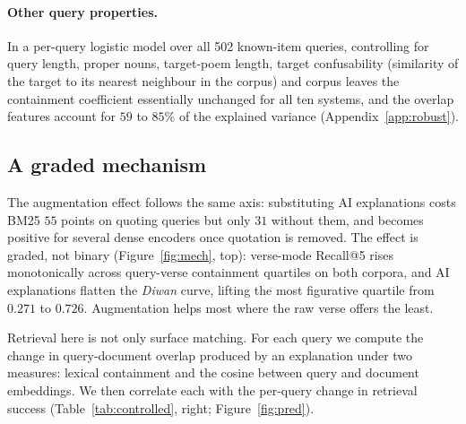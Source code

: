 \documentclass[11pt]{article}
\begin{document}
\paragraph{Other query properties.} In a per-query logistic model over all 502 known-item queries, controlling for query length, proper nouns, target-poem length, target confusability (similarity of the target to its nearest neighbour in the corpus) and corpus leaves the containment coefficient essentially unchanged for all ten systems, and the overlap features account for $59$ to $85\%$ of the explained variance (Appendix~\ref{app:robust}).

\begin{table}[t]
\centering\small
\setlength{\tabcolsep}{2.1pt}

\caption{Left: verse-mode Recall@5 on \textit{Fann or Flop}, stratified by verbatim quotation, with slope $\Delta$ and its difference against Qwen3-8B (paired bootstrap). Right: within-query Spearman $\rho$ between overlap change and retrieval change (\textit{Diwan}, AI explanations); bold marks the better predictor. $^{*}p{=}.045$, Holm-corrected across the nine comparisons. $\dagger$gte's $\rho_{\mathrm{emb}}$ is not independent of the measure (Appendix~\ref{app:pred}).}
\label{tab:controlled}
\end{table}

\subsection{A graded mechanism}
\label{sec:graded}

The augmentation effect follows the same axis: substituting AI explanations costs BM25 $55$ points on quoting queries but only $31$ without them, and becomes positive for several dense encoders once quotation is removed. The effect is graded, not binary (Figure~\ref{fig:mech}, top): verse-mode Recall@5 rises monotonically across query-verse containment quartiles on both corpora, and AI explanations flatten the \textit{Diwan} curve, lifting the most figurative quartile from $0.271$ to $0.726$. Augmentation helps most where the raw verse offers the least.

Retrieval here is not only surface matching. For each query we compute the change in query-document overlap produced by an explanation under two measures: lexical containment and the cosine between query and document embeddings. We then correlate each with the per-query change in retrieval success (Table~\ref{tab:controlled}, right; Figure~\ref{fig:pred}).
\end{document}
